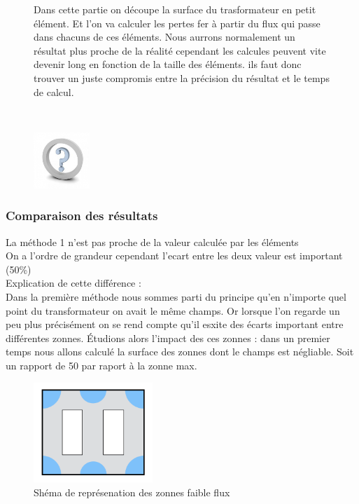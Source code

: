 \vspace{-10px}
\begin{figure}[ht]
\centering
\begin{minipage}{.5\textwidth}  
Dans cette partie on découpe la surface du trasformateur en petit élément. Et l'on va calculer les pertes fer à partir du flux qui passe dans chacuns de ces éléments.
 Nous aurrons normalement un résultat plus proche de la réalité cependant les calcules peuvent vite devenir long en fonction de la taille des éléments. ils faut donc trouver un juste compromis entre la précision du résultat et le temps de calcul. 
\end{minipage}~
\begin{minipage}{.5\textwidth}
  \centering
\includegraphics[height=80px]{images/question-mark}   %
\end{minipage}
\end{figure}
\FloatBarrier
\vspace{20px}
	


\subsubsection{Comparaison des résultats}

La méthode 1 n'est pas proche de la valeur calculée par les éléments\\
On a l'ordre de grandeur cependant l'ecart entre les deux valeur est important (50\%)\\

Explication de cette différence : \\
Dans la première méthode nous sommes parti du principe qu'en n'importe quel point du transformateur on avait le même champs. Or lorsque l'on regarde un peu plus précisément on se rend compte qu'il esxite des écarts important entre différentes zonnes.
Étudions alors l'impact des ces zonnes : dans un premier temps nous allons calculé la surface des zonnes dont le champs est négliable. Soit un rapport de 50 par raport à la zonne max.

\begin{figure}[ht]
	\begin{center}
	\includegraphics[width=0.4\textwidth]{images/TP3_zones_mortes}
	\caption{Shéma de représenation des zonnes faible flux}\label{img:RepChamps}
	\end{center}
\end{figure}
\FloatBarrier

